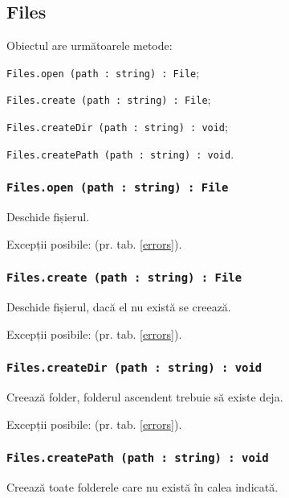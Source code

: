 \subsection{Files}

Obiectul \files{} are următoarele metode:
\begin{icItems}
	\item \texttt{Files.open (path : string) : File};
	\item \texttt{Files.create (path : string) : File};
	\item \texttt{Files.createDir (path : string) : void};
	\item \texttt{Files.createPath (path : string) : void}.
\end{icItems}

\subsubsection{\texttt{Files.open (path : string) : File}}

Deschide fișierul.

Excepții posibile:  (pr. tab. \ref{errors}).

\subsubsection{\texttt{Files.create (path : string) : File}}

Deschide fișierul, dacă el nu există se creează.

Excepții posibile:  (pr. tab. \ref{errors}).

\subsubsection{\texttt{Files.createDir (path : string) : void}}

Creează folder, folderul ascendent trebuie să existe deja.

Excepții posibile:  (pr. tab. \ref{errors}).

\subsubsection{\texttt{Files.createPath (path : string) : void}}

Creează toate folderele care nu există în calea indicată.

